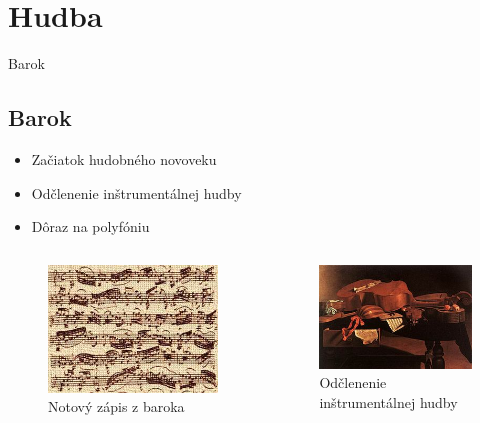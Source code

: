 \documentclass[dvipsnames]{beamer}
\begin{document}
\section{Hudba}
\frame{\sectionpage}
\begin{frame}{Barok}
	\subsection{Barok}
	\begin{itemize}
		\item Začiatok hudobného novoveku
		\item Odčlenenie inštrumentálnej hudby
		\item Dôraz na polyfóniu
	\end{itemize}
	\begin{columns}
		
		\kern0pt
		\begin{figure}
		\includegraphics[scale=1.5]{baroko}
		\caption{Notový zápis z baroka}
		\end{figure}%
		
		\begin{figure}
			\includegraphics[scale=1.5]{in}
			\caption{Odčlenenie inštrumentálnej hudby}
		\end{figure}
	\end{columns}

\end{frame}
\end{document}
